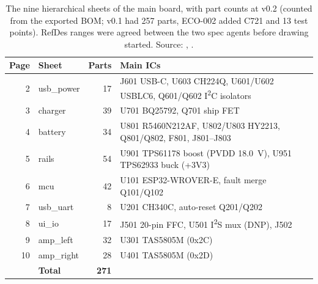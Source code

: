 \begin{table}[htbp]
\centering\small
\caption{The nine hierarchical sheets of the main board, with part counts at v0.2 (counted from the exported BOM; v0.1 had 257 parts, ECO-002 added C721 and 13 test points). RefDes ranges were agreed between the two spec agents before drawing started. Source: \protect{}, \protect{}.}
\label{tab:sheets}
\begin{tabular}{@{}r l r l@{}}
\toprule
Page & Sheet & Parts & Main ICs \\
\midrule
2 & usb\_power & 17 & J601 USB-C, U603 CH224Q, U601/U602 USBLC6, Q601/Q602 I\textsuperscript{2}C isolators \\
3 & charger & 39 & U701 BQ25792, Q701 ship FET \\
4 & battery & 34 & U801 R5460N212AF, U802/U803 HY2213, Q801/Q802, F801, J801--J803 \\
5 & rails & 54 & U901 TPS61178 boost (PVDD \qty{18.0}{\volt}), U951 TPS62933 buck (+3V3) \\
6 & mcu & 42 & U101 ESP32-WROVER-E, fault merge Q101/Q102 \\
7 & usb\_uart & 8 & U201 CH340C, auto-reset Q201/Q202 \\
8 & ui\_io & 17 & J501 20-pin FFC, U501 I\textsuperscript{2}S mux (DNP), J502 \\
9 & amp\_left & 32 & U301 TAS5805M (0x2C) \\
10 & amp\_right & 28 & U401 TAS5805M (0x2D) \\
\midrule
 & \textbf{Total} & \textbf{271} & \\
\bottomrule
\end{tabular}
\end{table}
